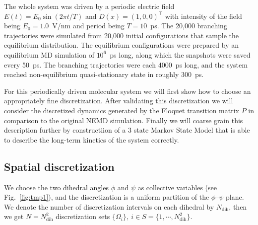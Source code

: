 \documentclass[aps, pre, preprint,unsortedaddress,a4paper,onecolumn]{revtex4}
\newcommand{\redc}[1]{{\color{red} #1}}
\newcommand{\vect}[1]{#1}
\newcommand{\dih}{\textrm{dih}}
\begin{document}
The whole system was driven by a periodic electric field
$E(t) = E_0\sin(2\pi t/T)$ and $D(x) = (1,0,0)^{\top}$
with intensity of the field being $E_0 = 1.0$~V/nm and period being
$T = 10$~ps.
The 20,000 branching trajectories were simulated from 20,000
initial configurations that sample the equilibrium distribution.
The equilibrium configurations were prepared by an equilibrium MD simulation
of $10^6$~ps long, along which the snapshots were saved every 50~ps.
The branching
trajectories were each 4000~ps long, and the system reached
non-equilibrium quasi-stationary state in roughly 300~ps.


For this periodically driven molecular system we will first show how to choose an appropriately fine discretization. After validating this discretization we will consider
the discretized dynamics generated by the Floquet transition matrix $\vect P$
in comparison to the original NEMD simulation. Finally we will coarse grain this description further by constructiion of a $3$ state Markov State Model that is able to describe the long-term kinetics of the system correctly. 

\subsection{Spatial discretization}

We choose the
two dihedral angles $\phi$ and $\psi$ as collective variables (see
Fig.~\ref{fig:tmp1}), and the discretization is a uniform partition of
the $\phi$--$\psi$ plane. We denote the number of discretization intervals on each
dihedral by $N_\dih$, then we get $N = N_\dih^2$ discretization sets 
$\{\Omega_i\},\ i\in S = \{1,\cdots,N_\dih^2\}$.
\end{document}
